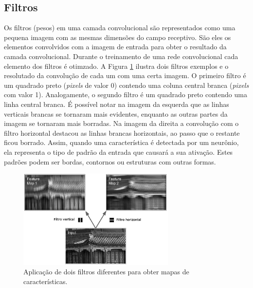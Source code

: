 \subsection{Filtros}
Os filtros (pesos) em uma camada convolucional são representados como uma pequena
imagem com as mesmas dimensões do campo receptivo. São eles os elementos
convolvidos com a imagem de entrada para obter o resultado da camada convolucional.
Durante o treinamento de uma rede convolucional cada elemento dos filtros é otimzado.
A Figura \ref{fig:conv_filt} ilustra dois filtros exemplos e o resolutado da convolução
de cada um com uma certa imagem. O primeiro filtro é um quadrado preto
(\textit{pixels} de valor 0) contendo uma coluna central branca (\textit{pixels} com valor 1). 
Analogamente, o segundo filtro é um quadrado preto contendo uma linha central branca.
É possível notar na imagem da esquerda que as linhas verticais brancas se tornaram mais
evidentes, enquanto as outras partes da imagem se tornaram mais borradas. Na imagem da direita 
a convolução com o filtro horizontal destacou as linhas brancas horizontais, ao passo que
o restante ficou borrado. Assim, quando uma característica é detectada por um neurônio, ela representa
o tipo de padrão da entrada que causará a sua ativação.
Estes padrões podem ser bordas, contornos ou estruturas com outras formas.
\begin{figure}[htp]
\begin{center}
  \includegraphics[width=0.7\textwidth]{fig/conv_filt}
  \caption{Aplicação de dois filtros diferentes para obter mapas de características.}
  \label{fig:conv_filt}
\end{center}
\end{figure}

